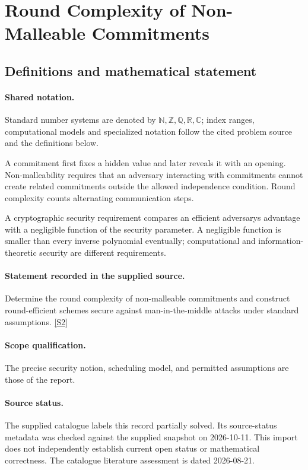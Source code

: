 \documentclass[11pt]{article}
\newcommand{\sref}[2]{\hyperlink{source:#1:#2}{[S#2]}}
\begin{document}
\section{Round Complexity of Non-Malleable Commitments}\label{statement}

\subsection{Definitions and mathematical statement}

\paragraph{Shared notation.}Standard number systems are denoted by $\mathbb N,\mathbb Z,\mathbb Q,\mathbb R,\mathbb C$; index ranges, computational models and specialized notation follow the cited problem source and the definitions below.


A commitment first fixes a hidden value and later reveals it with an opening. Non-malleability requires that an adversary interacting with commitments cannot create related commitments outside the allowed independence condition. Round complexity counts alternating communication steps.

A cryptographic security requirement compares an efficient adversary\textquotesingle s advantage with a negligible function of the security parameter. A negligible function is smaller than every inverse polynomial eventually; computational and information-theoretic security are different requirements.
\paragraph{Statement recorded in the supplied source.}
Determine the round complexity of non-malleable commitments and construct round-efficient schemes secure against man-in-the-middle attacks under standard assumptions. \sref{statement}{2}
\paragraph{Scope qualification.}
The precise security notion, scheduling model, and permitted assumptions are those of the report.
\paragraph{Source status.}
The supplied catalogue labels this record partially solved. Its source-status metadata was checked against the supplied snapshot on 2026-10-11. This import does not independently establish current open status or mathematical correctness. The catalogue literature assessment is dated 2026-08-21.
\end{document}
